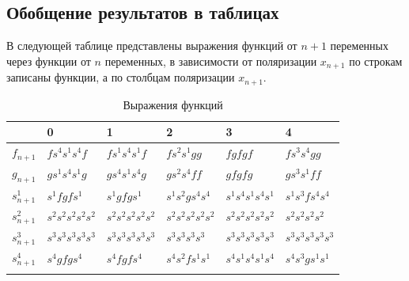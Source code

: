 \documentclass[bibliography=totoc, a4paper, 14pt]{extarticle}
\begin{document}
\subsection{Обобщение результатов в таблицах}
В следующей таблице представлены выражения функций от $n+1$ переменных через функции от $n$
переменных, в зависимости от поляризации $x_{n+1}$ по строкам записаны функции, а по столбцам
поляризации $x_{n+1}$.
\begin{center}
\begin{longtable}[h]{| l | l | l | l | l | l |}

\hline & 0 & 1 & 2 & 3 & 4 \\
\hline

$f_{n+1}$ & $f s^4 s^1 s^4 f$ & $f s^1 s^4 s^1 f$ & $f s^2 s^1 g g$ & $f g f g f$ & $f s^3 s^4 g g$
\\ \hline

$g_{n+1}$ & $g s^1 s^4 s^1 g$ & $g s^4 s^1 s^4 g$ & $g s^2 s^4 f f$ & $g f g f g$ & $g s^3 s^1 f f$
\\ \hline

$s^1_{n+1}$ & $s^1 f g f s^1$ & $s^1 g f g s^1$ & $s^1 s^2 g s^4 s^4$ & $s^1 s^4 s^1 s^4 s^1$ & $s^1 s^3 f s^4 s^4$
\\ \hline

$s^2_{n+1}$ & $s^2 s^2 s^2 s^2 s^2$ & $s^2 s^2 s^2 s^2 s^2$ & $s^2 s^2 s^2 s^2 s^2$ & $s^2 s^2 s^2 s^2 s^2$ & $s^2 s^2 s^2 s^2$
\\ \hline

$s^3_{n+1}$ & $s^3 s^3 s^3 s^3 s^3$ & $s^3 s^3 s^3 s^3 s^3$ & $s^3 s^3 s^3 s^3$ & $s^3 s^3 s^3 s^3 s^3$ & $s^3 s^3 s^3 s^3 s^3$
\\ \hline

$s^4_{n+1}$ & $s^4 g f g s^4$ & $s^4 f g f s^4$ & $s^4 s^2 f s^1 s^1$ & $s^4 s^1 s^4 s^1 s^4$ & $s^4 s^3 g s^1 s^1$
\\ \hline

\caption{Выражения функций}
\label{functab}
\end{longtable}
\end{center}
\end{document}
